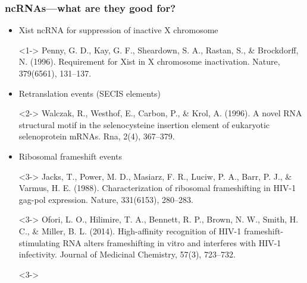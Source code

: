 \documentclass{beamer}
\begin{document}
\begin{frame}
	\frametitle{ncRNAs---what are they good for?}
	\begin{itemize}
		\item<1-> Xist ncRNA for suppression of inactive X chromosome
		\item[]<1-> \scriptsize Penny, G. D., Kay, G. F., Sheardown, S. A., Rastan, S., \& Brockdorff, N. (1996). Requirement for Xist in X chromosome inactivation. Nature, 379(6561), 131--137.
		\item<2-> Retranslation events (SECIS elements)
		\item[]<2-> \scriptsize Walczak, R., Westhof, E., Carbon, P., \& Krol, A. (1996). A novel RNA structural motif in the selenocysteine insertion element of eukaryotic selenoprotein mRNAs. Rna, 2(4), 367--379.


		\item<3-> Ribosomal frameshift events
		\item[]<3-> \scriptsize Jacks, T., Power, M. D., Masiarz, F. R., Luciw, P. A., Barr, P. J., \& Varmus, H. E. (1988). Characterization of ribosomal frameshifting in HIV-1 gag-pol expression. Nature, 331(6153), 280--283.
		\item[]<3-> \scriptsize Ofori, L. O., Hilimire, T. A., Bennett, R. P., Brown, N. W., Smith, H. C., \& Miller, B. L. (2014). High-affinity recognition of HIV-1 frameshift-stimulating RNA alters frameshifting in vitro and interferes with HIV-1 infectivity. Journal of Medicinal Chemistry, 57(3), 723--732.


		\item[]<3->
	\end{itemize}
\end{frame}
\end{document}
